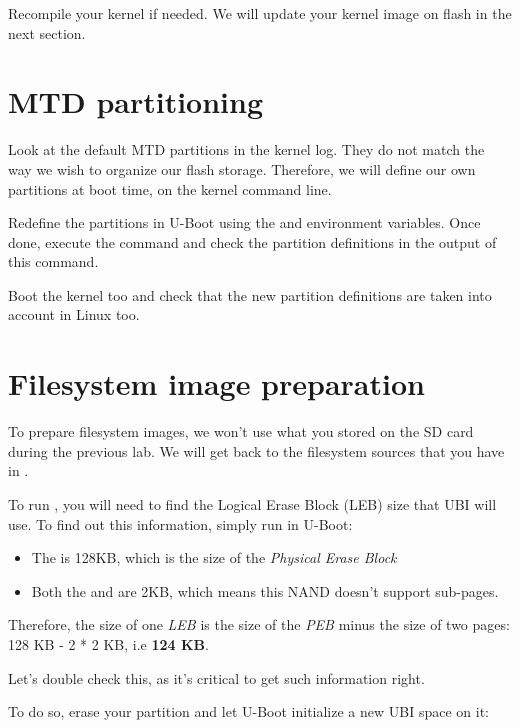 Recompile your kernel if needed. We will update your kernel image on flash
in the next section.

\section{MTD partitioning}

Look at the default MTD partitions in the kernel log. They do not
match the way we wish to organize our flash
storage. Therefore, we will define our own partitions at boot time,
on the kernel command line.

Redefine the partitions in U-Boot using the  and
 environment variables.
Once done, execute the  command and check the partition
definitions in the output of this command.

Boot the kernel too and check that the new partition definitions
are taken into account in Linux too.

\section{Filesystem image preparation}

To prepare filesystem images, we won't use what you stored on the SD
card during the previous lab. We will get back to the filesystem sources
that you have in .

To run , you will need to find the Logical Erase
Block (LEB) size that UBI will use. To find out this information,
simply run  in U-Boot:

\begin{itemize}

\item The  is 128KB, which is the size of the {\em
    Physical Erase Block}

\item Both the  and  are 2KB, which
  means this NAND doesn't support sub-pages.

\end{itemize}

Therefore, the size of one {\em LEB} is the size of the {\em PEB}
minus the size of two pages: 128 KB - 2 * 2 KB, i.e {\bf 124 KB}.

Let's double check this, as it's critical to get such information right.

To do so, erase your  partition and let U-Boot initialize
a new UBI space on it:


